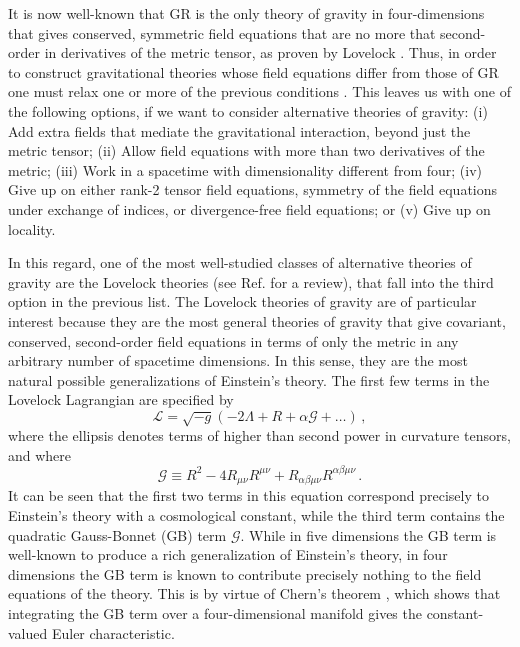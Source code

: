 \documentclass[reprint,amsmath,amssymbGaps,onecolumn,notitlepage,nofootinbib]{revtex4-1}
\begin{document}
\par It is now well-known that GR is the only theory of gravity in four-dimensions that gives conserved, symmetric field equations that are no more that second-order in derivatives of the metric tensor, as proven by Lovelock \cite{Lovelock}. Thus, in order to construct gravitational theories whose field equations differ from those of GR one must relax one or more of the previous conditions \cite{Clifton:2011jh}. This leaves us with one of the following options, if we want to consider alternative theories of gravity: (i) Add extra fields that mediate the gravitational interaction, beyond just the metric tensor; (ii) Allow field equations with more than two derivatives of the metric; (iii) Work in a spacetime with dimensionality different from four; (iv) Give up on either rank-2 tensor field equations, symmetry of the field equations under exchange of indices, or divergence-free field equations; or (v) Give up on locality.

\par In this regard, one of the most well-studied classes of alternative theories of gravity are the Lovelock theories \cite{Lovelock} (see Ref. \cite{Padmanabhan:2013xyr} for a review), that fall into the third option in the previous list. The Lovelock theories of gravity are of particular interest because they are the most general theories of gravity that give covariant, conserved, second-order field equations in terms of only the metric in any arbitrary number of spacetime dimensions. In this sense, they are the most natural possible generalizations of Einstein’s theory. The first few terms in the Lovelock Lagrangian are specified by 
\begin{equation}
\label{Love3}
\mathcal{L} = \sqrt{-g} \left( - 2 \Lambda +R + \alpha \mathcal{G} + \dots \right) \, ,
\end{equation}
where the ellipsis denotes terms of higher than second power in curvature tensors, and where
\begin{equation}
\mathcal{G} \equiv R^2 - 4 R_{\mu \nu} R^{\mu \nu} + R_{\alpha \beta \mu \nu} R^{\alpha \beta \mu \nu} \,.
\label{eq:GB}
\end{equation}
It can be seen that the first two terms in this equation correspond precisely to Einstein's theory with a cosmological constant, while the third term contains the quadratic Gauss-Bonnet (GB) term $\mathcal{G}$. While in five dimensions the GB term is well-known to produce a rich generalization of Einstein's theory, in four dimensions the GB term is known to contribute precisely nothing to the field equations of the theory. This is by virtue of Chern's theorem \cite{ChernTheorem}, which shows that integrating the GB term over a four-dimensional manifold gives the constant-valued Euler characteristic.
\end{document}
